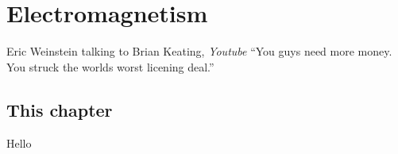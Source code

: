 \documentclass[../rzero]{subfiles}
\begin{document}
\chapter{Electromagnetism}\label{electromagnetismChapter}

\begin{chapquote}{Eric Weinstein talking to Brian Keating, \textit{Youtube\cite{drbriankeatingEricWeinsteinTheoretical2020}}}
``You guys need more money. You struck the worlds worst licening deal.''
\end{chapquote}


\section{This chapter}
Hello
\end{document}
